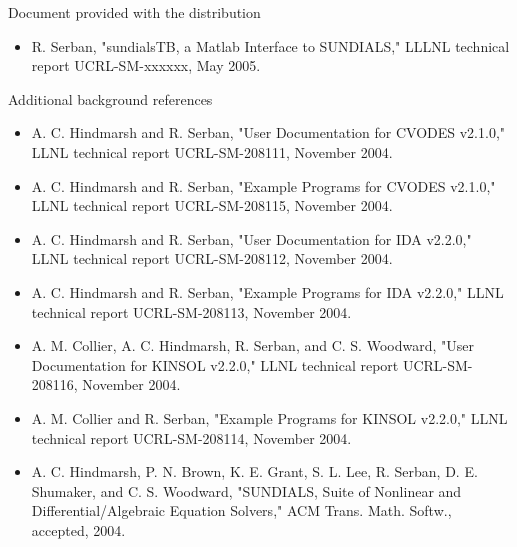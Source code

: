\documentclass[12pt]{letter}
\begin{document}
\begin{letter}
\begin{enumerate}
Document provided with the distribution
\begin{itemize}
\item R. Serban, "sundialsTB, a Matlab Interface to SUNDIALS," 
      LLLNL technical report UCRL-SM-xxxxxx, May 2005.
\end{itemize}
Additional background references
\begin{itemize}
\item A. C. Hindmarsh and R. Serban, "User Documentation for CVODES v2.1.0," 
    LLNL technical report UCRL-SM-208111, November 2004.
\item A. C. Hindmarsh and R. Serban, "Example Programs for CVODES v2.1.0," 
    LLNL technical report UCRL-SM-208115, November 2004.
\item A. C. Hindmarsh and R. Serban, "User Documentation for IDA v2.2.0," 
    LLNL technical report UCRL-SM-208112, November 2004.
\item A. C. Hindmarsh and R. Serban, "Example Programs for IDA v2.2.0," 
    LLNL technical report UCRL-SM-208113, November 2004.
\item A. M. Collier, A. C. Hindmarsh, R. Serban, and C. S. Woodward,
    "User Documentation for KINSOL v2.2.0," LLNL technical report
    UCRL-SM-208116, November 2004. 
\item A. M. Collier and R. Serban, "Example Programs for KINSOL v2.2.0,"
    LLNL technical report UCRL-SM-208114, November 2004.
\item A. C. Hindmarsh, P. N. Brown, K. E. Grant, S. L. Lee, R. Serban, 
    D. E. Shumaker, and C. S. Woodward, "SUNDIALS, Suite of Nonlinear and 
    Differential/Algebraic Equation Solvers," ACM Trans. Math. Softw., 
    accepted, 2004.
\end{itemize}
\end{enumerate}

\end{letter}
\end{document}
